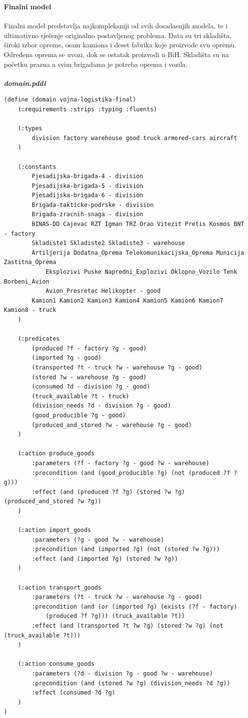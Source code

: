 \documentclass{article}
\begin{document}
\Large
\noindent
\textbf{Finalni model}
\\~\\
\normalsize 
Finalni model predstavlja najkompleksniji od svih dosadasnjih modela, te i ultimativno rješenje originalno postavljenog problema. Data su tri skladišta, široki izbor opreme, osam kamiona i deset fabrika koje proizvode svu opremu. Određena oprema se uvozi, dok se ostatak proizvodi u BiH. Skladišta su na početku prazna a svim brigadama je potreba oprema i vozila.
\\~\\
\textbf{\textit{domain.pddl}}
\begin{verbatim}
(define (domain vojna-logistika-final)
    (:requirements :strips :typing :fluents)

    (:types
        division factory warehouse good truck armored-cars aircraft
    )

    (:constants
        Pjesadijska-brigada-4 - division
        Pjesadijska-brigada-5 - division
        Pjesadijska-brigada-6 - division
        Brigada-takticke-podrske - division
        Brigada-zracnih-snaga - division
        BINAS-DD Cajevac RZT Igman TRZ Orao Vitezit Pretis Kosmos BNT - factory
        Skladiste1 Skladiste2 Skladiste3 - warehouse
        Artiljerija Dodatna_Oprema Telekomunikacijska_Oprema Municija Zastitna_Oprema 
            Eksplozivi Puske Napredni_Explozivi Oklopno_Vozilo Tenk Borbeni_Avion 
            Avion_Presretac Helikopter - good
        Kamion1 Kamion2 Kamion3 Kamion4 Kamion5 Kamion6 Kamion7 Kamion8 - truck
    )

    (:predicates
        (produced ?f - factory ?g - good)
        (imported ?g - good)
        (transported ?t - truck ?w - warehouse ?g - good)
        (stored ?w - warehouse ?g - good)
        (consumed ?d - division ?g - good)
        (truck_available ?t - truck)
        (division_needs ?d - division ?g - good)
        (good_producible ?g - good)
        (produced_and_stored ?w - warehouse ?g - good)
    )

    (:action produce_goods
        :parameters (?f - factory ?g - good ?w - warehouse)
        :precondition (and (good_producible ?g) (not (produced ?f ?g)))
        :effect (and (produced ?f ?g) (stored ?w ?g) (produced_and_stored ?w ?g))
    )

    (:action import_goods
        :parameters (?g - good ?w - warehouse)
        :precondition (and (imported ?g) (not (stored ?w ?g)))
        :effect (and (imported ?g) (stored ?w ?g))
    )

    (:action transport_goods
        :parameters (?t - truck ?w - warehouse ?g - good)
        :precondition (and (or (imported ?g) (exists (?f - factory) 
            (produced ?f ?g))) (truck_available ?t))
        :effect (and (transported ?t ?w ?g) (stored ?w ?g) (not (truck_available ?t)))
    )

    (:action consume_goods
        :parameters (?d - division ?g - good ?w - warehouse)
        :precondition (and (stored ?w ?g) (division_needs ?d ?g))
        :effect (consumed ?d ?g)
    )
)

\end{verbatim}
\end{document}
